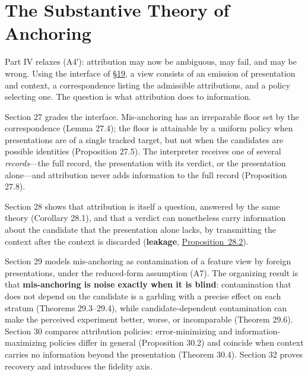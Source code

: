 \part{The Substantive Theory of Anchoring}


Part IV relaxes (A4′): attribution may now be ambiguous, may fail, and may be wrong. Using the interface of \hyperlink{sec:19}{§19}, a view consists of an emission of presentation and context, a correspondence listing the admissible attributions, and a policy selecting one. The question is what attribution does to information.

Section 27 grades the interface. Mis-anchoring has an irreparable floor set by the correspondence (Lemma 27.4); the floor is attainable by a uniform policy when presentations are of a single tracked target, but not when the candidates are possible identities (Proposition 27.5). The interpreter receives one of several \emph{records}---\hspace{0pt}the full record, the presentation with its verdict, or the presentation alone---\hspace{0pt}and attribution never adds information to the full record (Proposition 27.8).

Section 28 shows that attribution is itself a question, answered by the same theory (Corollary 28.1), and that a verdict can nonetheless carry information about the candidate that the presentation alone lacks, by transmitting the context after the context is discarded (\textbf{leakage}, \hyperlink{stmt:28.2}{Proposition~28.2}).

Section 29 models mis-anchoring as contamination of a feature view by foreign presentations, under the reduced-form assumption (A7). The organizing result is that \textbf{mis-anchoring is noise exactly when it is blind}: contamination that does not depend on the candidate is a garbling with a precise effect on each stratum (Theorems 29.3--29.4), while candidate-dependent contamination can make the perceived experiment better, worse, or incomparable (Theorem 29.6). Section 30 compares attribution policies: error-minimizing and information-maximizing policies differ in general (Proposition 30.2) and coincide when context carries no information beyond the presentation (Theorem 30.4). Section 32 proves recovery and introduces the fidelity axis.


